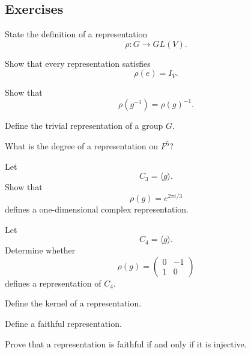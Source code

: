 \subsection{Exercises}
\label{subsec:representation-exercises}

\begin{exercise}[1]
State the definition of a representation
\[ \rho:G\to GL(V). \]
\end{exercise}

\begin{exercise}[1]
Show that every representation satisfies
\[ \rho(e)=I_V. \]
\end{exercise}

\begin{exercise}[1]
Show that
\[ \rho(g^{-1})=\rho(g)^{-1}. \]
\end{exercise}

\begin{exercise}[1]
Define the trivial representation of a group \(G\).
\end{exercise}

\begin{exercise}[1]
What is the degree of a representation on \(F^5\)?
\end{exercise}

\begin{exercise}[2]
Let
\[ C_3=\langle g\rangle. \]
Show that
\[ \rho(g)=e^{2\pi i/3} \]
defines a one-dimensional complex representation.
\end{exercise}

\begin{exercise}[2]
Let
\[ C_4=\langle g\rangle. \]
Determine whether
\[ \rho(g)=
\begin{pmatrix}
0&-1\\
1&0
\end{pmatrix}
\]
defines a representation of \(C_4\).
\end{exercise}

\begin{exercise}[1]
Define the kernel of a representation.
\end{exercise}

\begin{exercise}[1]
Define a faithful representation.
\end{exercise}

\begin{exercise}[2]
Prove that a representation is faithful if and only if it is injective.
\end{exercise}

